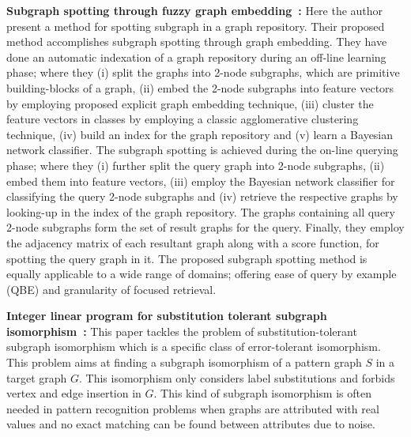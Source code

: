 \textbf{Subgraph spotting through fuzzy graph embedding~\cite{Luqman2011}:} Here the author present a method for spotting subgraph in a graph repository. Their proposed method accomplishes subgraph spotting through graph embedding. They have done an automatic indexation of a graph repository during an off-line learning phase; where they (i) split the graphs into 2-node subgraphs, which are primitive building-blocks of a graph, (ii) embed the 2-node subgraphs into feature vectors by employing proposed explicit graph embedding technique, (iii) cluster the feature vectors in classes by employing a classic agglomerative clustering technique, (iv) build an index for the graph repository and (v) learn a Bayesian network classifier. The subgraph spotting is achieved during the on-line querying phase; where they (i) further split the query graph into 2-node subgraphs, (ii) embed them into feature vectors, (iii) employ the Bayesian network classifier for classifying the query 2-node subgraphs and (iv) retrieve the respective graphs by looking-up in the index of the graph repository. The graphs containing all query 2-node subgraphs form the set of result graphs for the query. Finally, they employ the adjacency matrix of each resultant graph along with a score function, for spotting the query graph in it. The proposed subgraph spotting method is equally applicable to a wide range of domains; offering ease of query by example (QBE) and granularity of focused retrieval.

\textbf{Integer linear program for substitution tolerant subgraph isomorphism~\cite{LeBodic2012}:} This paper tackles the problem of substitution-tolerant subgraph isomorphism which is a specific class of error-tolerant isomorphism. This problem aims at finding a subgraph isomorphism of a pattern graph $S$ in a target graph $G$. This isomorphism only considers label substitutions and forbids vertex and edge insertion in $G$. This kind of subgraph isomorphism is often needed in pattern recognition problems when graphs are attributed with real values and no exact matching can be found between attributes due to noise.

